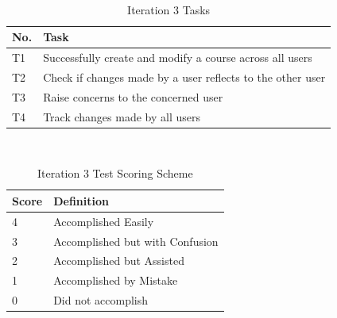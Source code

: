 \begin{table}
  \centering
  \caption{Iteration 3 Tasks}~\label{tab:tasks3}
  \addtolength{\tabcolsep}{2pt} 
  \begin{tabular}{p{0.5cm}|p{6.5cm}}
  	\toprule
    \rule{0pt}{8pt}No. & Task \\[2pt]
    \toprule
    T1 & Successfully create and modify a course across all users \\
    T2 & Check if changes made by a user reflects to the other user \\
    T3 & Raise concerns to the concerned user \\
    T4 & Track changes made by all users \\
    \bottomrule
  \end{tabular}
  \addtolength{\tabcolsep}{-2pt} 
\end{table}
\begin{table}
  \centering
  \caption{Iteration 3 Test Scoring Scheme}~\label{tab:itr3_scoring_scheme}
  \addtolength{\tabcolsep}{2pt} 
  \begin{tabular}{p{1cm}|p{5cm}}
  	\toprule
    \rule{0pt}{8pt}Score & Definition\\[2pt]
    \toprule
    4 & Accomplished Easily \\
    3 & Accomplished but with Confusion \\
    2 & Accomplished but Assisted \\
    1 & Accomplished by Mistake \\
    0 & Did not accomplish \\
    \bottomrule
  \end{tabular}
  \addtolength{\tabcolsep}{-2pt} 
\end{table}
